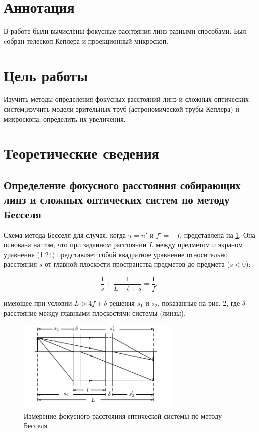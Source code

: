 \section*{Аннотация}
В работе были вычислены фокусные расстояния линз разными способами. Был cобран телескоп Кеплера и проекционный микроскоп.
\section*{Цель работы}
Изучить методы определения фокусных расстояний линз и сложных оптических систем;изучить модели зрительных труб (астрономической трубы Кеплера) и микроскопа, определить их увеличения.

\section*{Теоретические сведения}
\subsection*{Определение фокусного расстояния собирающих линз и сложных оптических систем по методу Бесселя}

Схема метода Бесселя для случая, когда $n = n'$ и $f' = -f$, представлена на \ref{fig:bessel}. Она основана на том, что при заданном расстоянии $L$ между предметом и экраном уравнение (1.24) представляет собой квадратное уравнение относительно расстояния $s$ от главной плоскости пространства предметов до предмета ($s < 0$):

\begin{equation}
\frac{1}{s} + \frac{1}{L - \delta + s} = \frac{1}{f},
\label{eq:bessel}
\end{equation}

имеющее при условии $L > 4f + \delta$ решения $s_1$ и $s_2$, показанные на рис. 2, где $\delta$ — расстояние между главными плоскостями системы (линзы).

\begin{figure}[h]
\centering
\includegraphics[width=0.7\textwidth]{images/bessel_method.png}
\caption{Измерение фокусного расстояния оптической системы по методу Бесселя}
\label{fig:bessel}
\end{figure}


